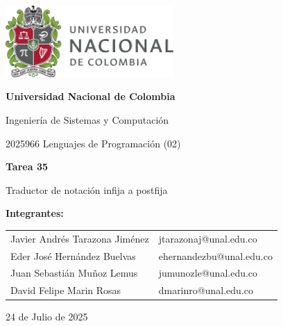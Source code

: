 \documentclass{article}
\begin{document}
\begin{titlepage}
    \centering
    \includegraphics[width=0.48\textwidth]{logo_universidad.png}
    \par\vspace{2cm}

    {\Large \textbf{Universidad Nacional de Colombia} \par}
    \vspace{0.5cm}
    {\large Ingeniería de Sistemas y Computación \par}
    {\large 2025966 Lenguajes de Programación (02)\par}
    \vspace{3cm}

    {\large \textbf{Tarea 35} \par}
    {\large Traductor de notación infija a postfija \par}
    \vspace{3cm}

    {\large \textbf{Integrantes:} \par}
    \vspace{0.5cm}
    \begin{tabular}{ll}
    Javier Andrés Tarazona Jiménez & jtarazonaj@unal.edu.co   \\
    Eder  José Hernández Buelvas   & ehernandezbu@unal.edu.co \\
    Juan Sebastián Muñoz Lemus     & jumunozle@unal.edu.co   \\
    David Felipe Marin Rosas       & dmarinro@unal.edu.co   \\
    \end{tabular}
    \par\vspace{3cm}

    {\large 24 de Julio de 2025 \par}
\end{titlepage}

\tableofcontents %

\newpage %
\end{document}
